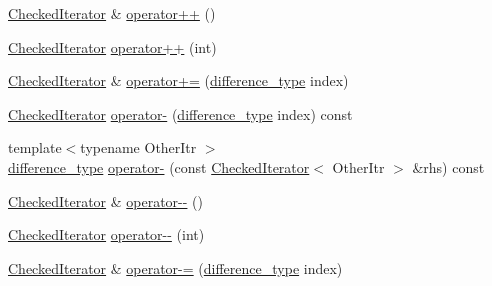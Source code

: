 \begin{DoxyCompactItemize}
\item 
\mbox{\hyperlink{classstanfordcpplib_1_1collections_1_1CheckedIterator}{Checked\+Iterator}} \& \mbox{\hyperlink{classstanfordcpplib_1_1collections_1_1CheckedIterator_aec7e0aa602c7fffa22efea6f10347abe}{operator++}} ()
\item 
\mbox{\hyperlink{classstanfordcpplib_1_1collections_1_1CheckedIterator}{Checked\+Iterator}} \mbox{\hyperlink{classstanfordcpplib_1_1collections_1_1CheckedIterator_afe0f310068b0df460af22eebb5ff7dc2}{operator++}} (int)
\item 
\mbox{\hyperlink{classstanfordcpplib_1_1collections_1_1CheckedIterator}{Checked\+Iterator}} \& \mbox{\hyperlink{classstanfordcpplib_1_1collections_1_1CheckedIterator_a656d0902269eb6956e1361c0c971db1d}{operator+=}} (\mbox{\hyperlink{classstanfordcpplib_1_1collections_1_1CheckedIterator_ad050e8e82b0962bb9ebd0e7c23b436ac}{difference\+\_\+type}} index)
\item 
\mbox{\hyperlink{classstanfordcpplib_1_1collections_1_1CheckedIterator}{Checked\+Iterator}} \mbox{\hyperlink{classstanfordcpplib_1_1collections_1_1CheckedIterator_a6738f3ff94429270180e9917f82b1b4f}{operator-\/}} (\mbox{\hyperlink{classstanfordcpplib_1_1collections_1_1CheckedIterator_ad050e8e82b0962bb9ebd0e7c23b436ac}{difference\+\_\+type}} index) const
\item 
{\footnotesize template$<$typename Other\+Itr $>$ }\\\mbox{\hyperlink{classstanfordcpplib_1_1collections_1_1CheckedIterator_ad050e8e82b0962bb9ebd0e7c23b436ac}{difference\+\_\+type}} \mbox{\hyperlink{classstanfordcpplib_1_1collections_1_1CheckedIterator_abea2eeaec28f98c3a57b6620607456b0}{operator-\/}} (const \mbox{\hyperlink{classstanfordcpplib_1_1collections_1_1CheckedIterator}{Checked\+Iterator}}$<$ Other\+Itr $>$ \&rhs) const
\item 
\mbox{\hyperlink{classstanfordcpplib_1_1collections_1_1CheckedIterator}{Checked\+Iterator}} \& \mbox{\hyperlink{classstanfordcpplib_1_1collections_1_1CheckedIterator_a994cd02eb359452202359cb1323536e5}{operator-\/-\/}} ()
\item 
\mbox{\hyperlink{classstanfordcpplib_1_1collections_1_1CheckedIterator}{Checked\+Iterator}} \mbox{\hyperlink{classstanfordcpplib_1_1collections_1_1CheckedIterator_ae420cb430131bca745a8c4b96e9d1c08}{operator-\/-\/}} (int)
\item 
\mbox{\hyperlink{classstanfordcpplib_1_1collections_1_1CheckedIterator}{Checked\+Iterator}} \& \mbox{\hyperlink{classstanfordcpplib_1_1collections_1_1CheckedIterator_acf54eff1b6f048a4b69722fc22d53e6f}{operator-\/=}} (\mbox{\hyperlink{classstanfordcpplib_1_1collections_1_1CheckedIterator_ad050e8e82b0962bb9ebd0e7c23b436ac}{difference\+\_\+type}} index)

\end{DoxyCompactItemize}
